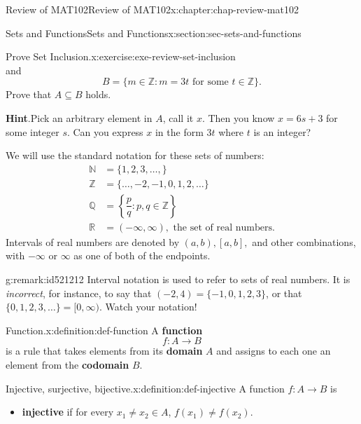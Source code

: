 \documentclass[oneside,10pt,]{book}
\newcommand{\blocktitlefont}{\relax}
\newcommand{\terminology}[1]{\textbf{#1}}
\numberwithin{equation}{section}
\newcommand{\amp}{&}
\begin{document}
\begin{chapterptx}{Review of MAT102}{}{Review of MAT102}{}{}{x:chapter:chap-review-mat102}
\begin{sectionptx}{Sets and Functions}{}{Sets and Functions}{}{}{x:section:sec-sets-and-functions}
\begin{inlineexercise}{Prove Set Inclusion.}{x:exercise:exe-review-set-inclusion}
\begin{equation*}
\end{equation*}
and%
\begin{equation*}
B = \{m \in \mathbb{Z} : m = 3t \text{ for some } t \in \mathbb{Z}\}\text{.}
\end{equation*}
Prove that \(A \subseteq B\) holds.%
\par\smallskip%
\noindent\textbf{\blocktitlefont Hint}.\hypertarget{g:hint:id521089}{}\quad{}Pick an arbitrary element in \(A\), call it \(x\). Then you know \(x = 6s + 3\) for some integer \(s\). Can you express \(x\) in the form \(3t\) where \(t\) is an integer?%
\end{inlineexercise}%
We will use the standard notation for these sets of numbers: \label{g:notation:id521107}\label{g:notation:id521116}\label{g:notation:id521154}\label{g:notation:id521174}\label{g:notation:id521170}%
\begin{align*}
\mathbb{N} \amp = \{1,2,3,\ldots,\}\\
\mathbb{Z} \amp = \{\ldots,-2,-1,0,1,2,\ldots\}\\
\mathbb{Q} \amp = \left\{\dfrac{p}{q} : p,q \in \mathbb{Z}\right\}\\
\mathbb{R} \amp = (-\infty,\infty), \text{ the set of real numbers.}
\end{align*}
Intervals of real numbers are denoted by \((a,b), [a,b],\) and other combinations, with \(-\infty\) or \(\infty\) as one of both of the endpoints.%
\begin{remark}{}{g:remark:id521212}%
Interval notation is used to refer to sets of real numbers. It is \emph{incorrect}, for instance, to say that \((-2,4) = \{-1,0,1,2,3\}\), or that \(\{0,1,2,3,\ldots\} = [0,\infty)\). Watch your notation!%
\end{remark}
\begin{definition}{Function.}{x:definition:def-function}%
\label{g:notation:id521205} A \terminology{function}%
\begin{equation*}
f: A \rightarrow B
\end{equation*}
is a rule that takes elements from its \terminology{domain} \(A\) and assigns to each one an element from the \terminology{codomain} \(B\).%
\end{definition}
\begin{definition}{Injective, surjective, bijective.}{x:definition:def-injective}%
A function \(f: A \rightarrow B\) is%
\begin{itemize}[label=\textbullet]
\item{}\terminology{injective} if for every \(x_1 \ne x_2 \in A\), \(f(x_1) \ne f(x_2)\).%

\end{itemize}
\end{definition}
\end{sectionptx}
\end{chapterptx}
\end{document}
